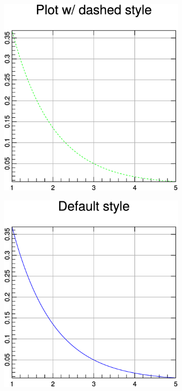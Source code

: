 \documentclass[a4paper]{article}
\begin{document}
\begin{figure}[h]
  \centering
  \begin{subfigure}[hb]{.32\linewidth}
    \includegraphics[width=\textwidth]{./examples_from_doc/plot/plot_1.eps}
  \end{subfigure}
    \hfill
  \begin{subfigure}[hb]{.32\linewidth}
    \includegraphics[width=\textwidth]{./examples_from_doc/plot/plot_2.eps}

\end{subfigure}
\end{figure}
\end{document}
